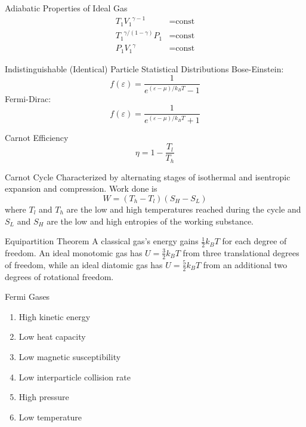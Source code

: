 \documentclass[avery5371,grid]{flashcards}
\begin{document}
\begin{flashcard}[Formula]{Adiabatic Properties of Ideal Gas}
	\begin{align*}
		T_1 {V_1}^{{\gamma}-1} &= \text{const} \\
		{T_1}^{{\gamma}/(1-{\gamma})} P_1 &= \text{const} \\
		P_1 {V_1}^{\gamma} &= \text{const}
	\end{align*}
\end{flashcard}

\begin{flashcard}[Formula]{Indistinguishable (Identical) Particle Statistical Distributions}
	Bose-Einstein:
		\[ f({\varepsilon}) = \frac{1}{e^{({\varepsilon}-{\mu})/k_B T} - 1} \]
	Fermi-Dirac:
		\[ f({\varepsilon}) = \frac{1}{e^{({\varepsilon}-{\mu})/k_B T} + 1} \]
\end{flashcard}

\begin{flashcard}[Formula]{Carnot Efficiency}
	\[ {\eta}  = 1 - \frac{T_l}{T_h} \]
\end{flashcard}

\begin{flashcard}[Theory]{Carnot Cycle}
	Characterized by alternating stages of isothermal and isentropic expansion
	and compression. Work done is
	\[ W = (T_h - T_l)(S_H - S_L) \]
	where $T_l$ and $T_h$ are the low and high temperatures reached during the
	cycle and $S_L$ and $S_H$ are the low and high entropies of the working
	substance.
\end{flashcard}

\begin{flashcard}[Theory]{Equipartition Theorem}
	A classical gas's energy gains $\frac 12 k_B T$ for each degree of
	freedom. An ideal monotomic gas has
		$ U = \frac 32 k_B T $
	from three translational degrees of freedom, while an ideal diatomic gas
	has
		$ U = \frac 52 k_B T $
	from an additional two degrees of rotational freedom.
\end{flashcard}

\begin{flashcard}[Theory]{Fermi Gases}
	\begin{enumerate}
		\item High kinetic energy
		\item Low heat capacity
		\item Low magnetic susceptibility
		\item Low interparticle collision rate
		\item High pressure
		\item Low temperature
	\end{enumerate}
\end{flashcard}
\end{document}
